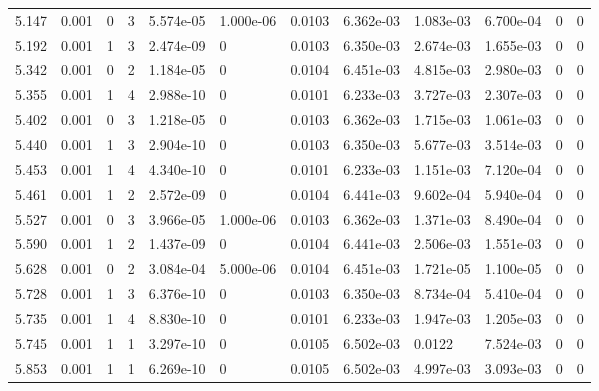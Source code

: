 \documentclass[preview]{standalone}
\begin{document}
{{{\begin{tabular}{L{1.2cm}C{1.2cm} C{0.3cm}C{0.5cm} C{1.4cm}C{1.4cm} C{1.4cm}C{1.4cm} C{1.6cm}C{1.6cm} C{1.6cm}C{1.6cm}}
  5.147  &  0.001  & 0     &  3 &  5.574e-05  & 1.000e-06  &  0.0103&   6.362e-03& 1.083e-03 & 6.700e-04   &  0 & 0  \\ 
  5.192  &  0.001  & 1     &  3 &  2.474e-09  & 0  &  0.0103&   6.350e-03& 2.674e-03 & 1.655e-03   &  0 & 0  \\ 
  5.342  &  0.001  & 0     &  2 &  1.184e-05  & 0  &  0.0104&   6.451e-03& 4.815e-03 & 2.980e-03   &  0 & 0  \\ 
  5.355  &  0.001  & 1     &  4 &  2.988e-10  & 0  &  0.0101&   6.233e-03& 3.727e-03 & 2.307e-03   &  0 & 0  \\ 
  5.402  &  0.001  & 0     &  3 &  1.218e-05  & 0  &  0.0103&   6.362e-03& 1.715e-03 & 1.061e-03   &  0 & 0  \\ 
  5.440  &  0.001  & 1     &  3 &  2.904e-10  & 0  &  0.0103&   6.350e-03& 5.677e-03 & 3.514e-03   &  0 & 0  \\ 
  5.453  &  0.001  & 1     &  4 &  4.340e-10  & 0  &  0.0101&   6.233e-03& 1.151e-03 & 7.120e-04   &  0 & 0  \\ 
  5.461  &  0.001  & 1     &  2 &  2.572e-09  & 0  &  0.0104&   6.441e-03& 9.602e-04 & 5.940e-04   &  0 & 0  \\ 
  5.527  &  0.001  & 0     &  3 &  3.966e-05  & 1.000e-06  &  0.0103&   6.362e-03& 1.371e-03 & 8.490e-04   &  0 & 0  \\ 
  5.590  &  0.001  & 1     &  2 &  1.437e-09  & 0  &  0.0104&   6.441e-03& 2.506e-03 & 1.551e-03   &  0 & 0  \\ 
  5.628  &  0.001  & 0     &  2 &  3.084e-04  & 5.000e-06  &  0.0104&   6.451e-03& 1.721e-05 & 1.100e-05   &  0 & 0  \\ 
  5.728  &  0.001  & 1     &  3 &  6.376e-10  & 0  &  0.0103&   6.350e-03& 8.734e-04 & 5.410e-04   &  0 & 0  \\ 
  5.735  &  0.001  & 1     &  4 &  8.830e-10  & 0  &  0.0101&   6.233e-03& 1.947e-03 & 1.205e-03   &  0 & 0  \\ 
  5.745  &  0.001  & 1     &  1 &  3.297e-10  & 0  &  0.0105&   6.502e-03& 0.0122 & 7.524e-03   &  0 & 0  \\ 
  5.853  &  0.001  & 1     &  1 &  6.269e-10  & 0  &  0.0105&   6.502e-03& 4.997e-03 & 3.093e-03   &  0 & 0  \\ 
\hline 
\end{tabular} 

}}}
\end{document}
